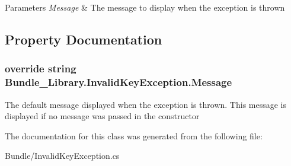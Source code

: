 \begin{DoxyParams}{Parameters}
{\em Message} & The message to display when the exception is thrown\\
\hline
\end{DoxyParams}


\subsection{Property Documentation}
\subsubsection[{Message}]{\setlength{\rightskip}{0pt plus 5cm}override string Bundle\+\_\+\+Library.\+Invalid\+Key\+Exception.\+Message\hspace{0.3cm}{\ttfamily [get]}}\label{class_bundle___library_1_1_invalid_key_exception_a909f1ead8e9f50400f74338e7d27c0fa}


The default message displayed when the exception is thrown. This message is displayed if no message was passed in the constructor 



The documentation for this class was generated from the following file\+:\begin{DoxyCompactItemize}
\item 
Bundle/Invalid\+Key\+Exception.\+cs\end{DoxyCompactItemize}

